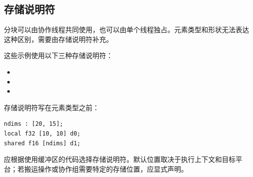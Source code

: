 \subsection*{存储说明符}

分块可以由协作线程共同使用，也可以由单个线程独占。元素类型和形状无法表达这种区别，需要由存储说明符补充。

这些示例使用以下三种存储说明符：

\begin{itemize}[leftmargin=1.6em]
\item \co@global@
\item \co@shared@
\item \co@local@
\end{itemize}

存储说明符写在元素类型之前：

\begin{lstlisting}[language=croqtile,caption={存储说明符}]
ndims : [20, 15];
local f32 [10, 10] d0;
shared f16 [ndims] d1;
\end{lstlisting}

应根据使用缓冲区的代码选择存储说明符。默认位置取决于执行上下文和目标平台；若搬运操作或协作组需要特定的存储位置，应显式声明。
